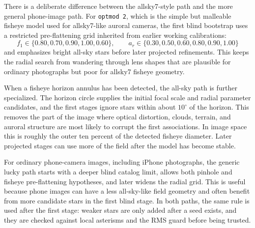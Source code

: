 \documentclass[11pt]{article}
\begin{document}
There is a deliberate difference between the allsky7-style path and the more
general phone-image path. For \texttt{optmod 2}, which is the simple but
malleable fisheye model used for allsky7-like auroral cameras, the first blind
bootstrap uses a restricted pre-flattening grid inherited from earlier working
calibrations:
\begin{equation}
  f_1 \in \{0.80,0.70,0.90,1.00,0.60\},
  \qquad
  a_r \in \{0.30,0.50,0.60,0.80,0.90,1.00\}
\end{equation}
and emphasizes bright all-sky stars before later projected refinements. This
keeps the radial search from wandering through lens shapes that are plausible
for ordinary photographs but poor for allsky7 fisheye geometry.

When a fisheye horizon annulus has been detected, the all-sky path is further
specialized. The horizon circle supplies the initial focal scale and radial
parameter candidates, and the first stages ignore stars within about
\(10^\circ\) of the horizon. This removes the part of the image where optical
distortion, clouds, terrain, and auroral structure are most likely to corrupt
the first associations. In image space this is roughly the outer ten percent of
the detected fisheye diameter. Later projected stages can use more of the field
after the model has become stable.

For ordinary phone-camera images, including iPhone photographs, the generic
lucky path starts with a deeper blind catalog limit, allows both pinhole and
fisheye pre-flattening hypotheses, and later widens the radial grid. This is
useful because phone images can have a less all-sky-like field geometry and
often benefit from more candidate stars in the first blind stage. In both
paths, the same rule is used after the first stage: weaker stars are only added
after a seed exists, and they are checked against local asterisms and the RMS
guard before being trusted.
\end{document}
